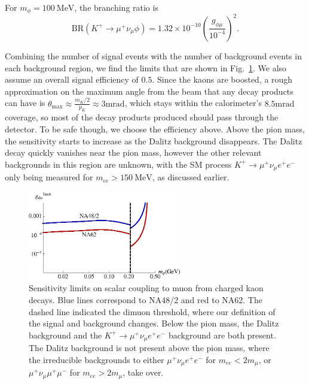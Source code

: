 \noindent For $m_\phi = 100~\textrm{MeV}$, the branching ratio is
\begin{equation}
    \textrm{BR}(K^+ \rightarrow \mu^+ \nu_\mu \phi) = 1.32\times 10^{-10} \left(\frac{g_{\phi\mu}}{10^{-4}}\right)^2\textrm{.}
\end{equation}

Combining the number of signal events with the number of background events in each background region, we find the limits that are shown in Fig.~\ref{fig:kaon_limits}.
We also assume an overall signal efficiency of $0.5$.
Since the kaons are boosted, a rough approximation on the maximum angle from the beam that any decay products can have is $\theta_\textrm{max} \approx \frac{m_K/2}{p_K} \approx 3\textrm{mrad}$, which stays within the calorimeter's $8.5\textrm{mrad}$ coverage, so most of the decay products produced should pass through the detector.
To be safe though, we choose the efficiency above.
Above the pion mass, the sensitivity starts to increase as the Dalitz background disappears.
The Dalitz decay quickly vanishes near the pion mass, however the other relevant backgrounds in this region are unknown, with the SM process $K^+ \rightarrow \mu^+ \nu_\mu e^+ e^-$ only being measured for $m_{ee} > 150~\textrm{MeV}$, as discussed earlier.

\begin{figure}[h]
    \centering
    \includegraphics[width=0.6\textwidth]{Figures/limits/kaon_all}
    \caption[Sensitivity limits on scalar coupling to muon from charged kaon decay.]{Sensitivity limits on scalar coupling to muon from charged kaon decays. Blue lines correspond to NA48/2 and red to NA62. The dashed line indicated the dimuon threshold, where our definition of the signal and background changes. Below the pion mass, the Dalitz background and the $K^+ \rightarrow \mu^+ \nu_\mu e^+ e^-$ background are both present. The Dalitz background is not present above the pion mass, where the irreducible backgrounds to either $\mu^+ \nu_\mu e^+ e^-$ for $m_{ee} < 2m_\mu$, or $\mu^+ \nu_\mu \mu^+ \mu^-$ for $m_{ee} > 2m_\mu$, take over.}
    \label{fig:kaon_limits}
\end{figure}
